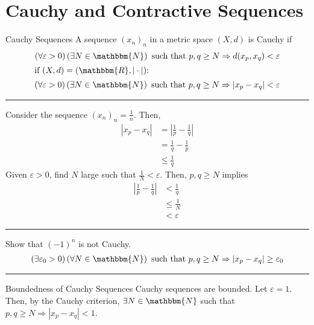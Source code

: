 \documentclass[10pt]{extarticle}
\newcommand{\N}{\mathbbm{N}}
\newcommand{\R}{\mathbbm{R}}
\begin{document}
  \section{Cauchy and Contractive Sequences}%
  \begin{problem}{Cauchy Sequences}
    A sequence $(x_n)_n$ in a metric space $(X,d)$ is Cauchy if 
    \begin{align*}
      \left(\forall \varepsilon > 0\right)\left(\exists N\in\N\right) \text{ such that } p,q\geq N \Rightarrow d(x_p,x_q) < \varepsilon\\
      \shortintertext{if $(X,d) = (\R,|\cdot|)$:}
      \left(\forall \varepsilon > 0\right)\left(\exists N\in\N\right) \text{ such that } p,q\geq N \Rightarrow |x_p-x_q| < \varepsilon
    \end{align*}
    \vspace{4pt}
    \rule{\textwidth}{0.4pt}
    \vspace{4pt}
    Consider the sequence $(x_n)_n = \frac{1}{n}$. Then,
    \begin{align*}
      |x_p - x_q| &= \left|\frac{1}{p}-\frac{1}{q}\right|\\
                  &= \frac{1}{q}-\frac{1}{p}\\
                  &\leq \frac{1}{q}
    \end{align*}
    Given $\varepsilon > 0$, find $N$ large such that $\frac{1}{N}< \varepsilon$. Then, $p,q\geq N$ implies
    \begin{align*}
      \left|\frac{1}{p}-\frac{1}{q}\right|& < \frac{1}{q}\\
                                          &\leq \frac{1}{N}\\
                                          &< \varepsilon
    \end{align*}
    \vspace{4pt}
    \rule{\textwidth}{0.4pt}
    \vspace{4pt}
    Show that $(-1)^n$ is not Cauchy.
    \begin{align*}
      \left(\exists \varepsilon_0 > 0\right)\left(\forall N\in\N\right) \text{ such that } p,q\geq N \Rightarrow |x_p - x_q| \geq \varepsilon_0
    \end{align*}
    \vspace{4pt}
    \rule{\textwidth}{0.4pt}
    \vspace{4pt}
    \begin{problem}{Boundedness of Cauchy Sequences}
      Cauchy sequences are bounded.
      \tcblower
      Let $\varepsilon = 1$. Then, by the Cauchy criterion, $\exists N\in\N$ such that $p,q\geq N \Rightarrow |x_p-x_q| < 1$.\\


\end{problem}
\end{problem}
\end{document}
